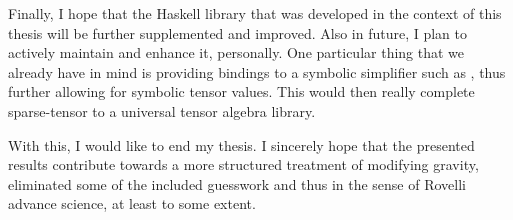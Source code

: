 Finally, I hope that the Haskell library that was developed in the context of this thesis will be further supplemented and improved. Also in future, I  plan to actively maintain and enhance it, personally. One particular thing that we already have in mind is providing bindings to a symbolic simplifier such as \cite{SymPy}, thus further allowing for symbolic tensor values. This would then really complete sparse-tensor to a universal tensor algebra library.

With this, I would like to end my thesis. I sincerely hope that the presented results contribute towards a more structured treatment of modifying gravity, eliminated some of the included guesswork and thus in the sense of Rovelli advance science, at least to some extent.
